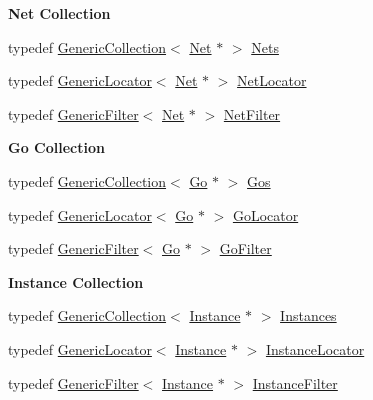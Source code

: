 \begin{Indent}\textbf{ Net Collection}\par
\begin{DoxyCompactItemize}
\item 
typedef \mbox{\hyperlink{classHurricane_1_1GenericCollection}{Generic\+Collection}}$<$ \mbox{\hyperlink{classHurricane_1_1Net}{Net}} $\ast$ $>$ \mbox{\hyperlink{namespaceHurricane_a3404a8b17130a1824f4a281704b04df7}{Nets}}
\item 
typedef \mbox{\hyperlink{classHurricane_1_1GenericLocator}{Generic\+Locator}}$<$ \mbox{\hyperlink{classHurricane_1_1Net}{Net}} $\ast$ $>$ \mbox{\hyperlink{namespaceHurricane_a2911512d442f8332c3cd3a135332cc02}{Net\+Locator}}
\item 
typedef \mbox{\hyperlink{classHurricane_1_1GenericFilter}{Generic\+Filter}}$<$ \mbox{\hyperlink{classHurricane_1_1Net}{Net}} $\ast$ $>$ \mbox{\hyperlink{namespaceHurricane_a0dfd2c5b40325a919d139091312732e9}{Net\+Filter}}
\end{DoxyCompactItemize}
\end{Indent}
\begin{Indent}\textbf{ Go Collection}\par
\begin{DoxyCompactItemize}
\item 
typedef \mbox{\hyperlink{classHurricane_1_1GenericCollection}{Generic\+Collection}}$<$ \mbox{\hyperlink{classHurricane_1_1Go}{Go}} $\ast$ $>$ \mbox{\hyperlink{namespaceHurricane_a4456a34f3bc6766d471c3064ace19759}{Gos}}
\item 
typedef \mbox{\hyperlink{classHurricane_1_1GenericLocator}{Generic\+Locator}}$<$ \mbox{\hyperlink{classHurricane_1_1Go}{Go}} $\ast$ $>$ \mbox{\hyperlink{namespaceHurricane_ab7d66a25194b15d7646c93bcc1b15fc8}{Go\+Locator}}
\item 
typedef \mbox{\hyperlink{classHurricane_1_1GenericFilter}{Generic\+Filter}}$<$ \mbox{\hyperlink{classHurricane_1_1Go}{Go}} $\ast$ $>$ \mbox{\hyperlink{namespaceHurricane_a372aada7b76742fd900d0bb2c5398e0c}{Go\+Filter}}
\end{DoxyCompactItemize}
\end{Indent}
\begin{Indent}\textbf{ Instance Collection}\par
\begin{DoxyCompactItemize}
\item 
typedef \mbox{\hyperlink{classHurricane_1_1GenericCollection}{Generic\+Collection}}$<$ \mbox{\hyperlink{classHurricane_1_1Instance}{Instance}} $\ast$ $>$ \mbox{\hyperlink{namespaceHurricane_ac9436b03a2926f34ad6863deae2baadc}{Instances}}
\item 
typedef \mbox{\hyperlink{classHurricane_1_1GenericLocator}{Generic\+Locator}}$<$ \mbox{\hyperlink{classHurricane_1_1Instance}{Instance}} $\ast$ $>$ \mbox{\hyperlink{namespaceHurricane_af4f7fa4dc3a2d3bdcec6f375dc5a21bc}{Instance\+Locator}}
\item 
typedef \mbox{\hyperlink{classHurricane_1_1GenericFilter}{Generic\+Filter}}$<$ \mbox{\hyperlink{classHurricane_1_1Instance}{Instance}} $\ast$ $>$ \mbox{\hyperlink{namespaceHurricane_a889ec1441e1876d9addf89dfab32e772}{Instance\+Filter}}
\end{DoxyCompactItemize}
\end{Indent}
